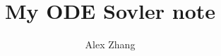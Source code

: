 \documentclass{article}
\title{My ODE Sovler note}
\author{Alex Zhang}
\begin{document}
\tableofcontents
\newpage
\section{}
\subsection{}

\end{document}
